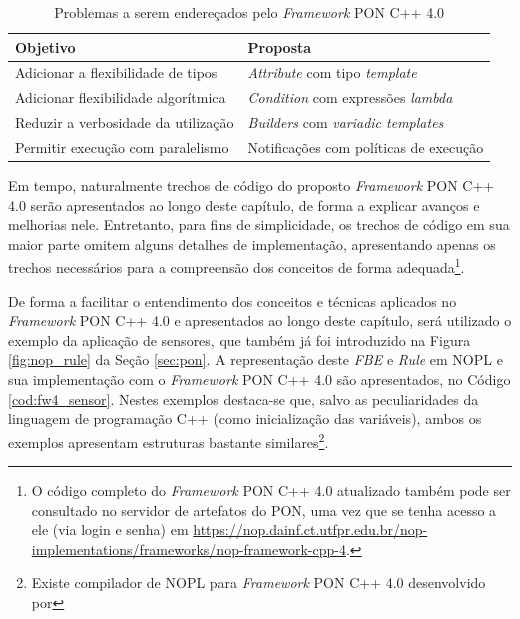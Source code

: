 \begin{table}[!htb]
\centering
\caption{Problemas a serem endereçados pelo \textit{Framework} PON C++ 4.0}
\smallskip
\begin{tabularx}{\textwidth}{|l|X|}\hline
    Objetivo & Proposta   \\\hline\hline
    Adicionar a flexibilidade de tipos & \textit{Attribute} com tipo \textit{template} \\ \hline
    Adicionar flexibilidade algorítmica & \textit{Condition} com expressões \textit{lambda} \\ \hline
    Reduzir a verbosidade da utilização & \textit{Builders} com \textit{variadic templates} \\ \hline
    Permitir execução com paralelismo & Notificações com políticas de execução \\ \hline
\end{tabularx}
\label{tab:obj_fw4}
\end{table}

Em tempo, naturalmente trechos de código do proposto \textit{Framework} PON C++
4.0 serão apresentados ao longo deste capítulo, de forma a explicar avanços e
melhorias nele. Entretanto, para fins de simplicidade, os trechos de código em
sua maior parte omitem alguns detalhes de implementação, apresentando apenas os
trechos necessários para a compreensão dos conceitos de forma
adequada\footnote{O código completo do \textit{Framework} PON C++ 4.0 atualizado
também pode ser consultado no servidor de artefatos do PON, uma vez que se tenha
acesso a ele (via login e senha) em
\url{https://nop.dainf.ct.utfpr.edu.br/nop-implementations/frameworks/nop-framework-cpp-4}.}.

De forma a facilitar o entendimento dos conceitos e técnicas aplicados no
\textit{Framework} PON C++ 4.0 e apresentados ao longo deste capítulo, será
utilizado o exemplo da aplicação de sensores, que também já foi introduzido na
Figura \ref{fig:nop_rule} da Seção \ref{sec:pon}. A representação deste
\textit{FBE} e \textit{Rule} em NOPL e sua implementação com o
\textit{Framework} PON C++ 4.0 são apresentados, no Código \ref{cod:fw4_sensor}.
Nestes exemplos destaca-se que,
salvo as peculiaridades da linguagem de programação C++ (como inicialização das
variáveis), ambos os exemplos apresentam estruturas bastante
similares\footnote{Existe compilador de NOPL para \textit{Framework} PON C++
4.0 desenvolvido por }.

